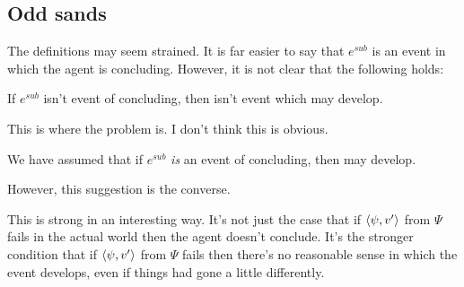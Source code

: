 \subsection{Odd sands}

\begin{note}
  The definitions may seem strained.
  It is far easier to say that \(e^{sub}\) is an event in which the agent is concluding.
  However, it is not clear that the following holds:

  \begin{suggestion}
    If \(e^{sub}\) isn't event of concluding, then isn't event which may develop.

    {
      \color{red}
      This is where the problem is.
      I don't think this is obvious.

      We have assumed that if \(e^{sub}\) \emph{is} an event of concluding, then may develop.

      However, this suggestion is the converse.
    }
  \end{suggestion}
\end{note}

\begin{note}
  \color{red}

  This is strong in an interesting way.
  It's not just the case that if \(\langle \psi, v' \rangle\) from \(\Psi\) fails in the actual world then the agent doesn't conclude.
  It's the stronger condition that if \(\langle \psi, v' \rangle\) from \(\Psi\) fails then there's no reasonable sense in which the event develops, even if things had gone a little differently.
\end{note}

